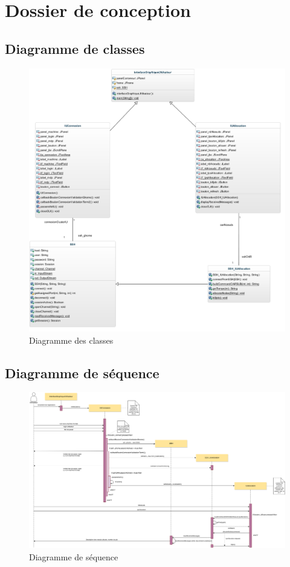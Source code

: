 \section{Dossier de conception}

\subsection{Diagramme de classes}
\label{sec:diagramme-de-classes}

\begin{figure}[h!]
  \centerline{
  \includegraphics[width=18cm]{images/diagramme_classes.png}}
  \caption{Diagramme des classes}
  \label{fig:diag_classes}
\end{figure}

\subsection{Diagramme de séquence}
\label{sec:diagr-de-sequ}

\begin{figure}[h!]
  \centering
  \includegraphics[width=16cm]{images/diagramme_sequence.png}
  \caption{Diagramme de séquence}
  \label{fig:diag_seq}
\end{figure}

